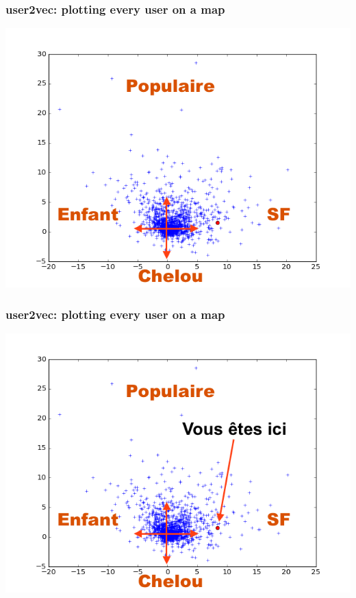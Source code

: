\documentclass[]{beamer}
\begin{document}
\begin{frame}
  \frametitle{user2vec: plotting every user on a map}
  \includegraphics[width=\linewidth]{figures/map.png}
\end{frame}

\begin{frame}
  \frametitle{user2vec: plotting every user on a map}
  \includegraphics[width=\linewidth]{figures/here.png}
\end{frame}
\end{document}
